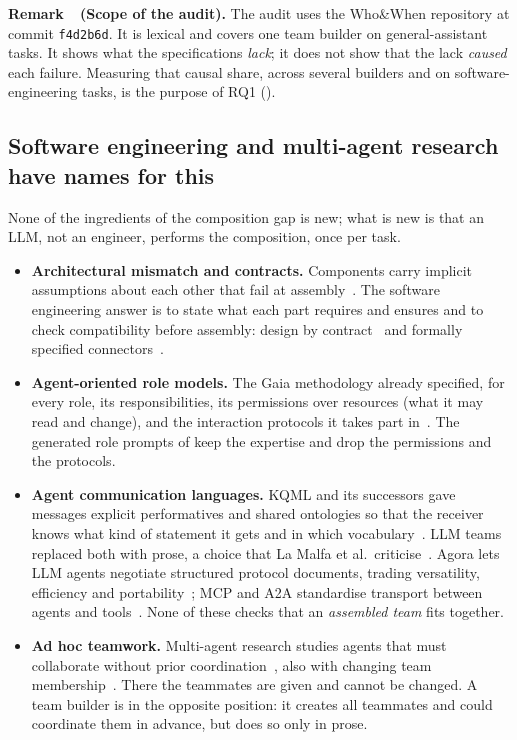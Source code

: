 \documentclass[10pt,a4paper]{article}
\newcommand{\code}[1]{\texttt{#1}}
\newcounter{remark}
\newenvironment{remark}[1][]{%
  \refstepcounter{remark}%
  \begin{tcolorbox}[enhanced, colback=accentlight, colframe=accentlight,
      borderline west={2.2pt}{0pt}{accent}, arc=0pt, boxrule=0pt,
      left=8pt, right=8pt, top=5pt, bottom=5pt, before skip=8pt, after skip=8pt]
  \textsf{\bfseries\color{accent}Remark~\theremark\if\relax\detokenize{#1}\relax\else\ (#1)\fi.}\enspace}%
  {\end{tcolorbox}}
\begin{document}
\begin{remark}[Scope of the audit]
The audit uses the Who\&When repository at commit \code{f4d2b6d}. It is
lexical and covers one team builder on general-assistant tasks. It shows what the specifications \emph{lack}; it does not show that
the lack \emph{caused} each failure. Measuring that causal share, across
several builders and on software-engineering tasks, is the purpose of RQ1
().
\end{remark}

\subsection{Software engineering and multi-agent research have names for this}\label{sec:ev-names}

None of the ingredients of the composition gap is new; what is new is that
an LLM, not an engineer, performs the composition, once per task.

\begin{itemize}
\item \textbf{Architectural mismatch and contracts.} Components carry
implicit assumptions about each other that fail at
assembly~\cite{garlan1995mismatch,garlan2009mismatch}. The software
engineering answer is to state what each part requires and ensures and to
check compatibility before assembly: design by contract~\cite{meyer1992dbc}
and formally specified connectors~\cite{allen1997connection}.
\item \textbf{Agent-oriented role models.} The Gaia methodology already
specified, for every role, its responsibilities, its permissions over
resources (what it may read and change), and the interaction protocols it
takes part in~\cite{wooldridge2000gaia}. The generated role prompts of
 keep the expertise and drop the permissions and the
protocols.
\item \textbf{Agent communication languages.} KQML and its successors gave
messages explicit performatives and shared ontologies so that the receiver
knows what kind of statement it gets and in which
vocabulary~\cite{finin1994kqml}. LLM teams replaced both with prose, a
choice that La Malfa et al.\ criticise~\cite{lamalfa2025miss}. Agora lets
LLM agents negotiate structured protocol documents, trading
versatility, efficiency and portability~\cite{marro2024agora}; MCP and A2A
standardise transport between agents and
tools~\cite{mcp2024,a2a2025}. None of these checks that an
\emph{assembled team} fits together.
\item \textbf{Ad hoc teamwork.} Multi-agent research studies agents that
must collaborate without prior coordination~\cite{stone2010adhoc}, also
with changing team membership~\cite{wang2024oaht}. There the teammates are
given and cannot be changed. A team builder is in the opposite position:
it creates all teammates and could coordinate them in advance, but does so
only in prose.
\end{itemize}
\end{document}
